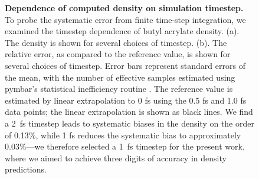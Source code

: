 \documentclass[journal=jacsat,manuscript=article]{achemso}
\begin{document}
\begin{figure}


\caption{
{\bf Dependence of computed density on simulation timestep.}
To probe the systematic error from finite time-step integration, we examined the timestep dependence of butyl acrylate density.  
(a).  The density is shown for several choices of timestep.  
(b).  The relative error, as compared to the reference value, is shown for several choices of timestep.  
Error bars represent standard errors of the mean, with the number of effective samples estimated using pymbar's statistical inefficiency routine \cite{shirts2008statistically}.  
The reference value is estimated by linear extrapolation to 0 fs using the 0.5 fs and 1.0 fs data points; the linear extrapolation is shown as black lines.  
We find a 2~fs timestep leads to systematic biases in the density on the order of 0.13\%, while 1 fs reduces the systematic bias to approximately 0.03\%---we therefore selected a 1~fs timestep for the present work, where we aimed to achieve three digits of accuracy in density predictions.
}
\label{figure:timestep}

\end{figure}
\end{document}
